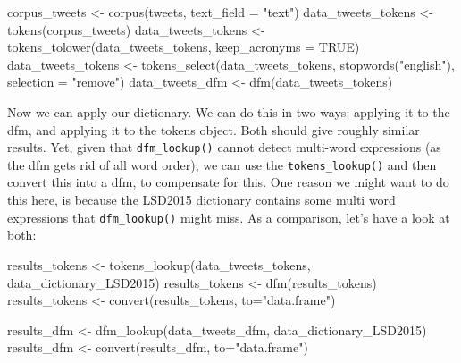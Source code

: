 \documentclass[
]{book}
\newenvironment{Shaded}{\begin{snugshade}}{\end{snugshade}}
\newcommand{\AttributeTok}[1]{\textcolor[rgb]{0.77,0.63,0.00}{#1}}
\newcommand{\ConstantTok}[1]{\textcolor[rgb]{0.00,0.00,0.00}{#1}}
\newcommand{\FunctionTok}[1]{\textcolor[rgb]{0.00,0.00,0.00}{#1}}
\newcommand{\NormalTok}[1]{#1}
\newcommand{\OtherTok}[1]{\textcolor[rgb]{0.56,0.35,0.01}{#1}}
\newcommand{\StringTok}[1]{\textcolor[rgb]{0.31,0.60,0.02}{#1}}
\begin{document}
\begin{Shaded}
\begin{Highlighting}[]
\NormalTok{corpus\_tweets }\OtherTok{\textless{}{-}} \FunctionTok{corpus}\NormalTok{(tweets, }\AttributeTok{text\_field =} \StringTok{"text"}\NormalTok{)}
\NormalTok{data\_tweets\_tokens }\OtherTok{\textless{}{-}} \FunctionTok{tokens}\NormalTok{(corpus\_tweets)}
\NormalTok{data\_tweets\_tokens }\OtherTok{\textless{}{-}} \FunctionTok{tokens\_tolower}\NormalTok{(data\_tweets\_tokens, }\AttributeTok{keep\_acronyms =} \ConstantTok{TRUE}\NormalTok{)}
\NormalTok{data\_tweets\_tokens }\OtherTok{\textless{}{-}} \FunctionTok{tokens\_select}\NormalTok{(data\_tweets\_tokens, }\FunctionTok{stopwords}\NormalTok{(}\StringTok{"english"}\NormalTok{), }\AttributeTok{selection =} \StringTok{"remove"}\NormalTok{)}
\NormalTok{data\_tweets\_dfm }\OtherTok{\textless{}{-}} \FunctionTok{dfm}\NormalTok{(data\_tweets\_tokens)}
\end{Highlighting}
\end{Shaded}

Now we can apply our dictionary. We can do this in two ways: applying it to the dfm, and applying it to the tokens object. Both should give roughly similar results. Yet, given that \texttt{dfm\_lookup()} cannot detect multi-word expressions (as the dfm gets rid of all word order), we can use the \texttt{tokens\_lookup()} and then convert this into a dfm, to compensate for this. One reason we might want to do this here, is because the LSD2015 dictionary contains some multi word expressions that \texttt{dfm\_lookup()} might miss. As a comparison, let's have a look at both:

\begin{Shaded}
\begin{Highlighting}[]
\NormalTok{results\_tokens }\OtherTok{\textless{}{-}} \FunctionTok{tokens\_lookup}\NormalTok{(data\_tweets\_tokens, data\_dictionary\_LSD2015)}
\NormalTok{results\_tokens }\OtherTok{\textless{}{-}} \FunctionTok{dfm}\NormalTok{(results\_tokens)}
\NormalTok{results\_tokens }\OtherTok{\textless{}{-}} \FunctionTok{convert}\NormalTok{(results\_tokens, }\AttributeTok{to=}\StringTok{"data.frame"}\NormalTok{)}

\NormalTok{results\_dfm }\OtherTok{\textless{}{-}} \FunctionTok{dfm\_lookup}\NormalTok{(data\_tweets\_dfm, data\_dictionary\_LSD2015)}
\NormalTok{results\_dfm }\OtherTok{\textless{}{-}} \FunctionTok{convert}\NormalTok{(results\_dfm, }\AttributeTok{to=}\StringTok{"data.frame"}\NormalTok{)}
\end{Highlighting}
\end{Shaded}
\end{document}
